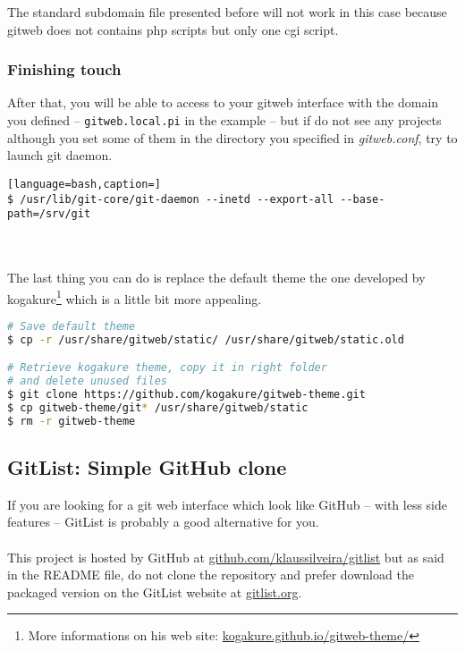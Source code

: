 \lstset{language=bash,caption=fcgiwrap.service from wiki.archlinux.org/index.php/gitweb}


The standard subdomain file presented before will not work in this case because 
gitweb does not contains php scripts but only one cgi script.

\lstset{language=bash,caption=Gitweb configuration for nginx}


\subsubsection{Finishing touch}
After that, you will be able to access to your gitweb interface with the domain 
you defined -- \texttt{gitweb.local.pi} in the example -- but if do not see any 
projects although you set some of them in the directory you specified in 
\emph{gitweb.conf}, try to launch git daemon.

\begin{lstlisting}[language=bash,caption=]
$ /usr/lib/git-core/git-daemon --inetd --export-all --base-path=/srv/git
\end{lstlisting}

\mbox{}\\\\
The last thing you can do is replace the default theme the one developed by 
kogakure\footnote{More informations on his web site: \href{http://kogakure.github
.io/gitweb-theme/}{kogakure.github.io/gitweb-theme/}} which is a little bit more 
appealing.

\begin{lstlisting}[language=bash,caption=Install kogakure gitweb theme]
# Save default theme
$ cp -r /usr/share/gitweb/static/ /usr/share/gitweb/static.old

# Retrieve kogakure theme, copy it in right folder
# and delete unused files
$ git clone https://github.com/kogakure/gitweb-theme.git
$ cp gitweb-theme/git* /usr/share/gitweb/static
$ rm -r gitweb-theme
\end{lstlisting}

\subsection{GitList: Simple GitHub clone}

If you are looking for a git web interface which look like GitHub -- with less 
side features -- GitList is probably a good alternative for you. 
\\\\
This project is hosted by GitHub at \href{https://github.com/klaussilveira/gitlist}
{github.com/klaussilveira/gitlist} but as said in the README file, do not clone 
the repository and prefer download the packaged version on the GitList website at 
\href{http://gitlist.org}{gitlist.org}.


